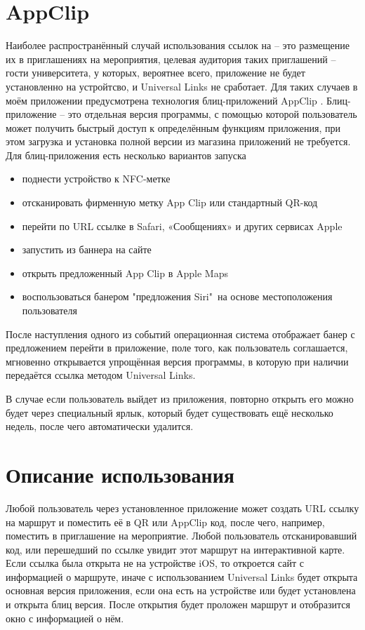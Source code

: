   \section{AppClip}
    Наиболее распространённый случай использования ссылок на  -- это размещение их в приглашениях на мероприятия, целевая аудитория таких приглашений -- гости университета, у которых, вероятнее всего, приложение не будет установленно на устройтсво, и Universal Links не сработает. Для таких случаев в моём приложении предусмотрена технология блиц-приложений AppClip \cite{AppClip}.
    Блиц-приложение -- это отдельная версия программы, с помощью которой пользователь может получить быстрый доступ к определённым функциям приложения, при этом загрузка и установка полной версии из магазина приложений не требуется.
    Для блиц-приложения есть несколько вариантов запуска
    \begin{itemize}
      \item поднести устройство к NFC-метке
      \item отсканировать фирменную метку App Clip или стандартный QR-код
      \item перейти по URL ссылке в Safari, «Сообщениях» и других сервисах Apple
      \item запустить из баннера на сайте
      \item открыть предложенный App Clip в Apple Maps
      \item воспользоваться банером "предложения Siri"\ на основе местоположения пользователя
    \end{itemize}


    После наступления одного из событий операционная система отображает банер с предложением перейти в приложение, поле того, как пользователь соглашается, мгновенно открывается упрощённая версия программы, в которую при наличии передаётся ссылка методом Universal Links.

    В случае если пользователь выйдет из приложения, повторно открыть его можно будет через специальный ярлык, который будет существовать ещё несколько недель, после чего автоматически удалится.

  \section{Описание использования}
    Любой пользователь через установленное приложение может создать URL ссылку на маршрут и поместить её в QR или AppClip код, после чего, например, поместить в приглашение на мероприятие. Любой пользователь отсканировавший код, или перешедший по ссылке увидит этот маршрут на интерактивной карте.
    Если ссылка была открыта не на устройстве iOS, то откроется сайт с информацией о маршруте, иначе с использованием Universal Links будет открыта основная версия приложения, если она есть на устройстве или будет установлена и открыта блиц версия. После открытия будет проложен маршрут и отобразится окно с информацией о нём.

